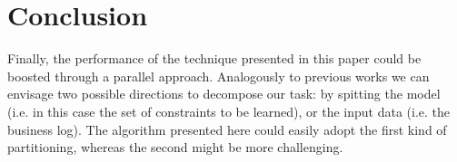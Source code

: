
\section{Conclusion}
Finally, the performance of the technique presented in this paper could be boosted through a parallel approach. Analogously to previous works \cite{2018a-Maggi, 2018-Loreti, 2020b-Loreti} we can envisage two possible directions to decompose our task: by spitting the model (i.e. in this case the set of constraints to be learned), or the input data (i.e. the business log). The algorithm presented here could easily adopt the first kind of partitioning, whereas the second might be more challenging.



